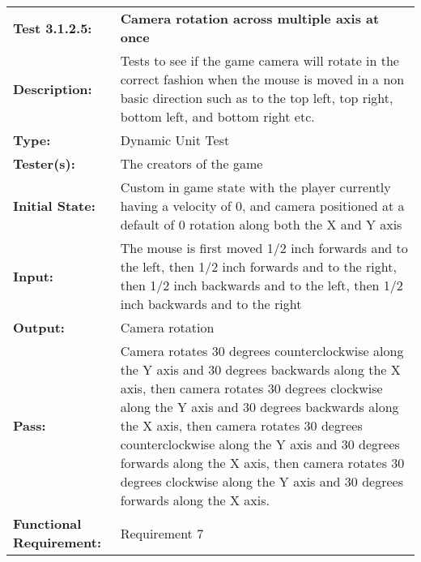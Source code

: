 \documentclass[12pt, titlepage]{article}
\begin{document}
\begin{mdframed}[linewidth=1pt]
\begin{tabularx}{\textwidth}{@{}p{3cm}X@{}}
{\bf Test 3.1.2.5:} & {\bf Camera rotation across multiple axis at once}\\[\baselineskip]
{\bf Description:} & Tests to see if the game camera will rotate in the correct fashion when the mouse is moved in a non basic direction such as to the top left,  top right, bottom left, and bottom right etc. \\[0.5\baselineskip]
{\bf Type:} & Dynamic Unit Test\\[0.5\baselineskip]
{\bf Tester(s):} & The creators of the game\\[0.5\baselineskip]
{\bf Initial State:} & Custom in game state with the player currently having a velocity of 0, and camera positioned at a default of 0 rotation along both the X and Y axis\\[0.5\baselineskip]
{\bf Input:} & The mouse is first moved 1/2 inch forwards and to the left, then 1/2 inch forwards and to the right, then 1/2 inch backwards and to the left, then 1/2 inch backwards and to the right\\[0.5\baselineskip]
{\bf Output:} & Camera rotation\\[0.5\baselineskip]
{\bf Pass:} & Camera rotates 30 degrees counterclockwise along the Y axis and 30 degrees backwards along the X axis, then camera rotates 30 degrees clockwise along the Y axis and 30 degrees backwards along the X axis, then camera rotates 30 degrees counterclockwise along the Y axis and 30 degrees forwards along the X axis, then camera rotates 30 degrees clockwise along the Y axis and 30 degrees forwards along the X axis. \\[0.5\baselineskip]
{\bf Functional Requirement:} & Requirement 7
\end{tabularx}
\end{mdframed}
\end{document}
